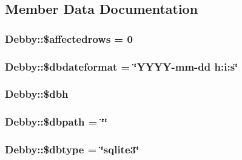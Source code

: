 \subsection{Member Data Documentation}
\hypertarget{classDebby_ab409e48612acfcba8cf89743b45b4457}{}
\subsubsection[{\$affectedrows}]{\setlength{\rightskip}{0pt plus 5cm}Debby\+::\$affectedrows = 0}\label{classDebby_ab409e48612acfcba8cf89743b45b4457}
\hypertarget{classDebby_a2f7e21b7f33e7ad7ea66a5f55ad7876a}{}
\subsubsection[{\$dbdateformat}]{\setlength{\rightskip}{0pt plus 5cm}Debby\+::\$dbdateformat = \char`\"{}Y\+Y\+Y\+Y-\/mm-\/{\bf dd} h\+:i\+:s\char`\"{}}\label{classDebby_a2f7e21b7f33e7ad7ea66a5f55ad7876a}
\hypertarget{classDebby_aa4930493a32523bb82bf4491e6e48f01}{}
\subsubsection[{\$dbh}]{\setlength{\rightskip}{0pt plus 5cm}Debby\+::\$dbh}\label{classDebby_aa4930493a32523bb82bf4491e6e48f01}
\hypertarget{classDebby_a95c130458f29f6c7c240cdc93a071085}{}
\subsubsection[{\$dbpath}]{\setlength{\rightskip}{0pt plus 5cm}Debby\+::\$dbpath = \char`\"{}\char`\"{}}\label{classDebby_a95c130458f29f6c7c240cdc93a071085}
\hypertarget{classDebby_a4697ceb97e707ab80ae2a215f932b58d}{}
\subsubsection[{\$dbtype}]{\setlength{\rightskip}{0pt plus 5cm}Debby\+::\$dbtype = \char`\"{}sqlite3\char`\"{}}\label{classDebby_a4697ceb97e707ab80ae2a215f932b58d}
\hypertarget{classDebby_a7ff78fa74f4b5822202b30a254600012}{}
